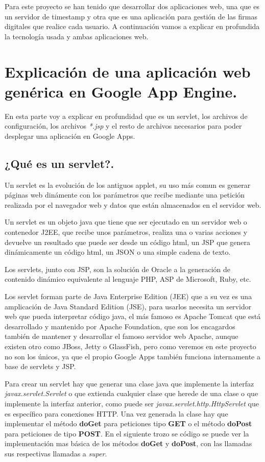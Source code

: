 Para este proyecto se han tenido que desarrollar dos aplicaciones web, una que es un servidor de timestamp y otra que es una aplicación para gestión de las firmas digitales que realice cada usuario. A continuación vamos a explicar en profundida la tecnología usada y ambas aplicaciones web.

\section{Explicación de una aplicación web genérica en Google App Engine.\label{ref_explicacion_google_app_engine}}
En esta parte voy a explicar en profundidad que es un servlet, los archivos de configuración, los archivos \textit{*.jsp} y el resto de archivos necesarios para poder desplegar una aplicación en Google Apps.
 
\subsection{¿Qué es un servlet?.}
Un servlet es la evolución de los antiguos applet, su uso más comun es generar páginas web dinámente con los parámetros que recibe mediante una petición realizada por el navegador web y datos que están almacenados en el servidor web.

Un servlet es un objeto java que tiene que ser ejecutado en un servidor web o contenedor J2EE, que recibe unos parámetros, realiza una o varias acciones y devuelve un resultado que puede ser desde un código html, un JSP que genera dinámicamente un código html, un JSON o una simple cadena de texto.

Los servlets, junto con JSP, son la solución de Oracle a la generación de contenido dinámico equivalente al lenguaje PHP, ASP de Microsoft, Ruby, etc.

Los servlet forman parte de Java Enterprise Edition (JEE) que a su vez es una amplicación de Java Standard Edition (JSE), para usarlos necesita un servidor web que pueda interpretar código java, el más famoso es Apache Tomcat que está desarrollado y mantenido por Apache Foundation, que son los encagardos también de mantener y desarrollar el famoso servidor web Apache, aunque existen otro como JBoss, Jetty o GlassFish, pero como veremos en este proyecto no son los únicos, ya que el propio Google Apps también funciona internamente a base de servlets y JSP.

Para crear un servlet hay que generar una clase java que implemente la interfaz \textit{javax.servlet.Servlet} o que extienda cualquier clase que herede de una clase o que implemente la interfaz anterior, como puede ser \textit{javax.servlet.http.HttpServlet} que es específico para conexiones HTTP. 
Una vez generada la clase hay que implementar el método \textbf{doGet} para peticiones tipo \textbf{GET} o el método \textbf{doPost} para peticiones de tipo \textbf{POST}. En el siguiente trozo se código se puede ver la implementación mas básica de los métodos \textbf{doGet} y \textbf{doPost}, con las llamadas sus respectivas llamadas a \textit{super}.

